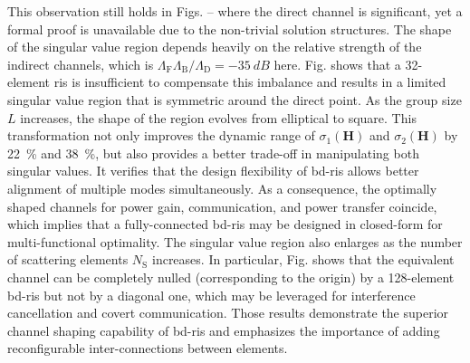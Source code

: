 \documentclass[
	fontsize=11pt,
	paper=a4,
	foldmarks=false
]{scrartcl}
\begin{document}
\begin{reviewer}
{{			This observation still holds in Figs.  --  where the direct channel is significant, yet a formal proof is unavailable due to the non-trivial solution structures.
			The shape of the singular value region depends heavily on the relative strength of the indirect channels, which is $\Lambda_\mathrm{F}\Lambda_\mathrm{B}/\Lambda_\mathrm{D}=\qty{-35}{dB}$ here.
			Fig.  shows that a 32-element \gls{ris} is insufficient to compensate this imbalance and results in a limited singular value region that is symmetric around the direct point.
			As the group size $L$ increases, the shape of the region evolves from elliptical to square.
			This transformation not only improves the dynamic range of $\sigma_1(\mathbf{H})$ and $\sigma_2(\mathbf{H})$ by \qty{22}{\percent} and \qty{38}{\percent}, but also provides a better trade-off in manipulating both singular values.
			It verifies that the design flexibility of \gls{bd}-\gls{ris} allows better alignment of multiple modes simultaneously.
			As a consequence, {the optimally shaped channels for power gain, communication, and power transfer coincide,} which implies that {a fully-connected \gls{bd}-\gls{ris} may be designed in closed-form for multi-functional optimality.}
			The singular value region also enlarges as the number of scattering elements $N_\mathrm{S}$ increases.
			In particular, Fig.  shows that the equivalent channel can be completely nulled (corresponding to the origin) by a 128-element \gls{bd}-\gls{ris} but not by a diagonal one, which may be leveraged for interference cancellation and covert communication.
			Those results demonstrate the superior channel shaping capability of \gls{bd}-\gls{ris} and emphasizes the importance of adding reconfigurable inter-connections between elements.
		}
	}



\end{reviewer}
\end{document}
